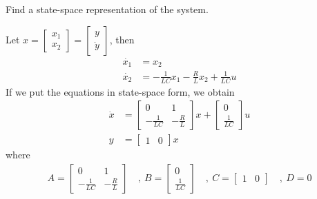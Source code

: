 \documentclass[twoside]{article}
\begin{document}
Find a state-space representation of the system.

\par

Let $x = \left[ \begin{array}{c} x_1 \\ x_2 \end{array} \right] = \left[ \begin{array}{c} y \\ \dot{y} \end{array} \right]$, then 
%
\begin{align*}
	\dot{x_1} &= x_2 \\
	\dot{x_2} &= -\frac{1}{LC} x_1 - \frac{R}{L} x_2 + \frac{1}{LC} u
\end{align*}
%
If we put the equations in state-space form, we obtain
%
\begin{align*}
 \dot{x} &= \left[  \begin{array}{cc} 0 & 1 \\ -\frac{1}{LC} &  -\frac{R}{L}  \end{array} \right] x 
 +  \left[  \begin{array}{c} 0 \\ \frac{1}{LC} \end{array} \right] u
 \\
 y &= \left[  \begin{array}{cc} 1 & 0 \end{array} \right] x 
\end{align*}
%
where
%
\begin{align*}
 A = \left[  \begin{array}{cc} 0 & 1 \\ -\frac{1}{LC} &  -\frac{R}{L}  \end{array} \right] \quad , \
 B = \left[  \begin{array}{c} 0 \\ \frac{1}{LC} \end{array} \right]  \quad , \
 C = \left[  \begin{array}{cc} 1 & 0 \end{array} \right] \quad , \
 D = 0
\end{align*}
\end{document}
